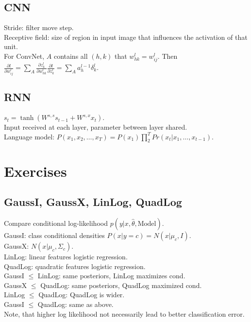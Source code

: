 \subsection*{CNN}

Stride: filter move step.\\
Receptive field: size of region in input image that influences the activation of that unit.\\
For ConvNet, $A$ contains all $(h, k)$ that $w_{hk}^l=w_{ij}^l$. Then $\frac{\partial l}{\partial w_{ij}^l} = \sum_A \frac{\partial z_k^l}{\partial w_{hk}^l} \frac{\partial l}{\partial z_k^l} = \sum_A a_h^{l-1} \delta_k^l$.

\subsection*{RNN}

$s_t = \tanh(W^{s,s}s_{t-1} + W^{s, x}x_t)$.\\
Input received at each layer, parameter between layer shared.\\
Language model: $P(x_1, x_2, \dots, x_T) = P(x_1)\prod_2^T Pr(x_t|x_1, \dots, x_{t-1})$.

\section{Exercises}

\subsection*{GaussI, GaussX, LinLog, QuadLog}

Compare conditional log-likelihood $p(y|x, \hat{\theta}, \text{Model})$.\\
GaussI: class conditional densities $P(x|y=c) = N(x|\mu_c, I)$.\\
GaussX: $N(x|\mu_c, \Sigma_c)$.\\
LinLog: linear features logistic regression.\\
QuadLog: quadratic features logistic regression.\\
GaussI $\leq$ LinLog: same posteriors, LinLog maximizes cond.\\
GaussX $\leq$ QuadLog: same posteriors, QuadLog maximized cond.\\
LinLog $\leq$ QuadLog: QuadLog is wider.\\
GaussI $\leq$ QuadLog: same as above.\\
Note, that higher log likelihood not necessarily lead to better classification error.

